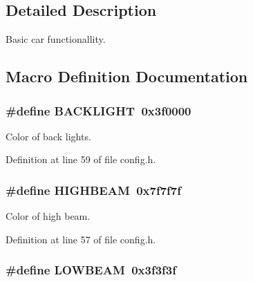 \subsection{Detailed Description}
Basic car functionallity. 



\subsection{Macro Definition Documentation}
\subsubsection[{\texorpdfstring{B\+A\+C\+K\+L\+I\+G\+HT}{BACKLIGHT}}]{\setlength{\rightskip}{0pt plus 5cm}\#define B\+A\+C\+K\+L\+I\+G\+HT~0x3f0000}\hypertarget{group__car_gae97ccf06dd29b2a0500f378068b678e2}{}\label{group__car_gae97ccf06dd29b2a0500f378068b678e2}


Color of back lights. 



Definition at line 59 of file config.\+h.

\subsubsection[{\texorpdfstring{H\+I\+G\+H\+B\+E\+AM}{HIGHBEAM}}]{\setlength{\rightskip}{0pt plus 5cm}\#define H\+I\+G\+H\+B\+E\+AM~0x7f7f7f}\hypertarget{group__car_ga3f561f12573270e4b5329bc5930ad20f}{}\label{group__car_ga3f561f12573270e4b5329bc5930ad20f}


Color of high beam. 



Definition at line 57 of file config.\+h.

\subsubsection[{\texorpdfstring{L\+O\+W\+B\+E\+AM}{LOWBEAM}}]{\setlength{\rightskip}{0pt plus 5cm}\#define L\+O\+W\+B\+E\+AM~0x3f3f3f}\hypertarget{group__car_ga61bb8d5dab460079c1b621b2d8a4bd9c}{}\label{group__car_ga61bb8d5dab460079c1b621b2d8a4bd9c}


